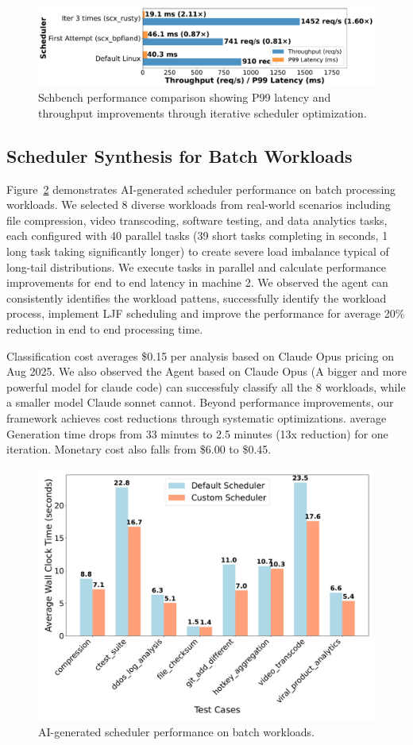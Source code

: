 \begin{figure}[h]
\centering
\includegraphics[width=0.9\columnwidth]{sections/schbench_performance_comparison.pdf}
\caption{Schbench performance comparison showing P99 latency and throughput improvements through iterative scheduler optimization.}
\label{fig:schbench-comparison}
\end{figure}

\subsection{Scheduler Synthesis for Batch Workloads}

Figure~\ref{fig:batch-performance} demonstrates AI-generated scheduler performance on batch processing workloads. We selected 8 diverse workloads from real-world scenarios including file compression, video transcoding, software testing, and data analytics tasks, each configured with 40 parallel tasks (39 short tasks completing in seconds, 1 long task taking significantly longer) to create severe load imbalance typical of long-tail distributions. We execute tasks in parallel and calculate performance improvements for end to end latency in machine 2. We observed the agent can consistently identifies the workload pattens, successfully identify the workload process, implement LJF scheduling and improve the performance for average 20\% reduction in end to end processing time.

Classification cost averages \$0.15 per analysis based on Claude Opus pricing on Aug 2025. We also observed the Agent based on Claude Opus (A bigger and more powerful model for claude code) can successfuly classify all the 8 workloads, while a smaller model Claude sonnet cannot. Beyond performance improvements, our framework achieves cost reductions through systematic optimizations. average Generation time drops from 33 minutes to 2.5 minutes (13x reduction) for one iteration. Monetary cost also falls from \$6.00 to \$0.45.

\begin{figure}[h]
\centering
\includegraphics[width=0.9\columnwidth]{sections/scheduler_performance_comparison.pdf}
\caption{AI-generated scheduler performance on batch workloads.}
\label{fig:batch-performance}
\end{figure}


